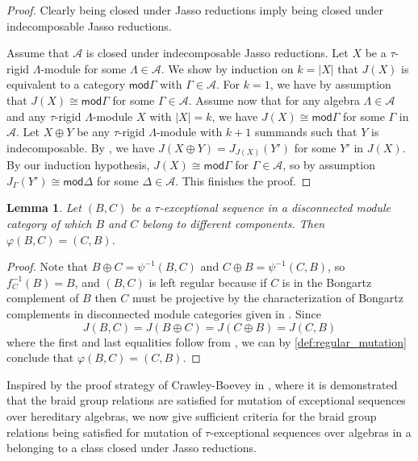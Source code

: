 \documentclass[11pt]{amsart}
\newcommand{\mods}{\mathsf{mod}}
\newtheorem{lemma}[theorem]{Lemma}
\theoremstyle{definition}
\begin{document}
\begin{proof}
    Clearly being closed under Jasso reductions imply being closed under indecomposable Jasso reductions.
    
    Assume that $\mathcal{A}$ is closed under indecomposable Jasso reductions. Let $X$ be a $\tau$-rigid $\Lambda$-module for some $\Lambda \in \mathcal{A}$. We show by induction on $k = |X|$ that $J(X)$ is equivalent to a category $\mods \Gamma$ with $\Gamma \in \mathcal{A}$. For $k = 1$, we have by assumption that $J(X) \cong \mods \Gamma $ for some $\Gamma \in \mathcal{A}$. Assume now that for any algebra $\Lambda \in \mathcal{A}$ and any $\tau$-rigid $\Lambda$-module $X$ with $|X| = k$, we have $J(X) \cong \mods \Gamma$ for some $\Gamma$ in $\mathcal{A}$. Let $X \oplus Y$ be any $\tau$-rigid $\Lambda$-module with $k+1$ summands such that $Y$ is indecomposable. By \cite[Thm. 6.3]{buan2023perpendicular}, we have $J(X \oplus Y) = J_{J(X)}(Y')$ for some $Y'$ in $J(X)$. By our induction hypothesis, $J(X) \cong \mods \Gamma $ for $\Gamma  \in \mathcal{A}$, so by assumption $J_\Gamma (Y') \cong \mods \Delta$ for some $\Delta \in \mathcal{A}$. This finishes the proof. 
\end{proof}

\begin{lemma}\label{lem:disconnect_mutation_swapping}
    Let $(B,C)$ be a $\tau$-exceptional sequence in a disconnected module category of which $B$ and $C$ belong to different components. Then $\varphi(B,C) = (C,B)$.
\end{lemma}

\begin{proof}
    Note that $B \oplus C = \psi^{-1}(B,C)$ and $C \oplus B = \psi^{-1}(C,B)$, so $f_C^{-1}(B) = B$, and $(B,C)$ is left regular because if $C$ is in the Bongartz complement of $B$ then $C$ must be projective by the characterization of Bongartz complements in disconnected module categories given in \cite[Lem. 4.12]{bkt}. Since \[J(B,C) = J(B \oplus C) = J(C \oplus B) = J(C,B)\] where the first and last equalities follow from \cite[Thm. 6.4]{buan2023perpendicular}, we can by \cref{def:regular_mutation} conclude that $\varphi(B,C) = (C,B)$.
\end{proof}

Inspired by the proof strategy of Crawley-Boevey in \cite{cbw92}, where it is demonstrated that the braid group relations are satisfied for mutation of exceptional sequences over hereditary algebras, we now give sufficient criteria for the braid group relations being satisfied for mutation of $\tau$-exceptional sequences over algebras in a belonging to a class closed under Jasso reductions.
\end{document}
